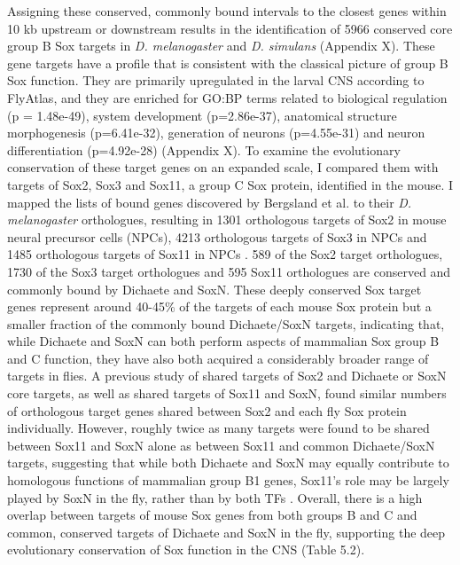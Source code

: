 Assigning these conserved, commonly bound intervals to the closest genes within 10 kb upstream or downstream results in the identification of 5966 conserved core group B Sox targets in \emph{D. melanogaster} and \emph{D. simulans} (Appendix X). These gene targets have a profile that is consistent with the classical picture of group B Sox function. They are primarily upregulated in the larval CNS according to FlyAtlas, and they are enriched for GO:BP terms related to biological regulation (p = 1.48e-49), system development (p=2.86e-37), anatomical structure morphogenesis (p=6.41e-32), generation of neurons (p=4.55e-31) and neuron differentiation (p=4.92e-28) (Appendix X). To examine the evolutionary conservation of these target genes on an expanded scale, I compared them with targets of Sox2, Sox3 and Sox11, a group C Sox protein, identified in the mouse. I mapped the lists of bound genes discovered by Bergsland et al. to their \emph{D. melanogaster} orthologues, resulting in 1301 orthologous targets of Sox2 in mouse neural precursor cells (NPCs), 4213 orthologous targets of Sox3 in NPCs and 1485 orthologous targets of Sox11 in NPCs \citep{bergsland_sequentially_2011}. 589 of the Sox2 target orthologues, 1730 of the Sox3 target orthologues and 595 Sox11 orthologues are conserved and commonly bound by Dichaete and SoxN. These deeply conserved Sox target genes represent around 40-45\% of the targets of each mouse Sox protein but a smaller fraction of the commonly bound Dichaete/SoxN targets, indicating that, while Dichaete and SoxN can both perform aspects of mammalian Sox group B and C function, they have also both acquired a considerably broader range of targets in flies. A previous study of shared targets of Sox2 and Dichaete or SoxN core targets, as well as shared targets of Sox11 and SoxN, found similar numbers of orthologous target genes shared between Sox2 and each fly Sox protein individually. However, roughly twice as many targets were found to be shared between Sox11 and SoxN alone as between Sox11 and common Dichaete/SoxN targets, suggesting that while both Dichaete and SoxN may equally contribute to homologous functions of mammalian group B1 genes, Sox11’s role may be largely played by SoxN in the fly, rather than by both TFs \citep{ferrero_soxneuro_2014}. Overall, there is a high overlap between targets of mouse Sox genes from both groups B and C and common, conserved targets of Dichaete and SoxN in the fly, supporting the deep evolutionary conservation of Sox function in the CNS (Table 5.2).\\

